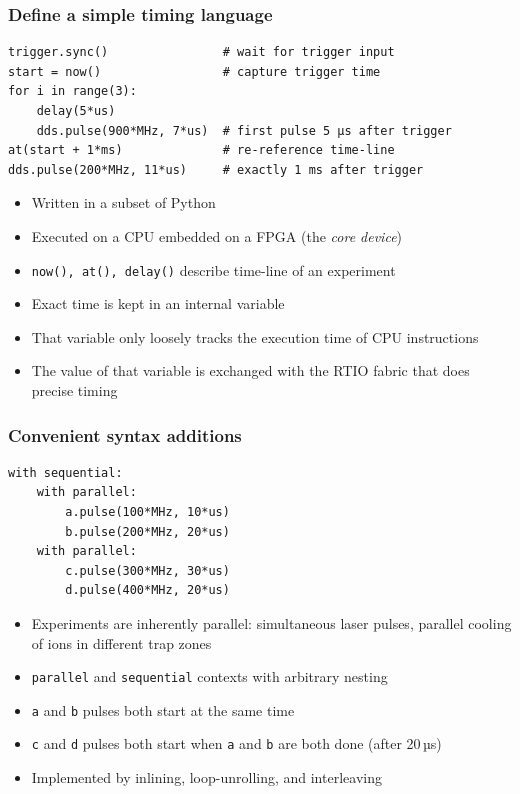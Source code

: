 \documentclass[final,presentation,compress]{beamer}
\begin{document}
\begin{frame}[fragile]
  \frametitle{Define a simple timing language}
  \footnotesize

  \begin{verbatim}
trigger.sync()                # wait for trigger input
start = now()                 # capture trigger time
for i in range(3):
    delay(5*us)
    dds.pulse(900*MHz, 7*us)  # first pulse 5 µs after trigger
at(start + 1*ms)              # re-reference time-line
dds.pulse(200*MHz, 11*us)     # exactly 1 ms after trigger
  \end{verbatim}

  \begin{itemize}
    \item Written in a subset of Python
    \item Executed on a CPU embedded on a FPGA (the \emph{core device})
    \item \verb!now(), at(), delay()! describe time-line of an experiment
    \item Exact time is kept in an internal variable
    \item That variable only loosely tracks the execution time of CPU instructions
    \item The value of that variable is exchanged with the RTIO fabric that
      does precise timing
  \end{itemize}
\end{frame}


\begin{frame}[fragile]
  \frametitle{Convenient syntax additions}
  \footnotesize
  \begin{verbatim}
with sequential:
    with parallel:
        a.pulse(100*MHz, 10*us)
        b.pulse(200*MHz, 20*us)
    with parallel:
        c.pulse(300*MHz, 30*us)
        d.pulse(400*MHz, 20*us)
  \end{verbatim}

  \begin{itemize}
    \item Experiments are inherently parallel:
        simultaneous laser pulses, parallel cooling of ions in different trap zones
    \item \verb!parallel! and \verb!sequential! contexts with arbitrary nesting
    \item \verb!a! and \verb!b! pulses both start at the same time
    \item \verb!c! and \verb!d! pulses both start when \verb!a! and \verb!b! are both done
      (after 20\,µs)
    \item Implemented by inlining, loop-unrolling, and interleaving
  \end{itemize}
\end{frame}
\end{document}
